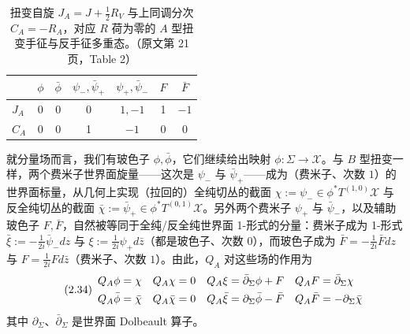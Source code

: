 \begin{table}[htbp]
\centering
\caption{扭变自旋 $J_A=J+\frac12R_V$ 与上同调分次 $C_A=-R_A$，对应 $R$ 荷为零的 $A$ 型扭变手征与反手征多重态。（原文第 21 页，Table 2）}
\begin{tabular}{lcccccc}
\toprule
 & $\phi$ & $\bar\phi$ & $\psi_-,\bar\psi_+$ & $\psi_+,\bar\psi_-$ & $F$ & $\bar F$\\
\midrule
$J_A$ & 0 & 0 & 0 & $1,-1$ & 1 & $-1$\\
$C_A$ & 0 & 0 & 1 & $-1$ & 0 & 0\\
\bottomrule
\end{tabular}
\end{table}

就分量场而言，我们有玻色子 $\phi,\bar\phi$，它们继续给出映射 $\phi:\Sigma\to\mathcal{X}$。与 $B$ 型扭变一样，两个费米子世界面旋量——这次是 $\psi_-$ 与 $\bar\psi_+$——成为（费米子、次数 $1$）的世界面标量，从几何上实现（拉回的）全纯切丛的截面 $\chi:=\psi_-\in\phi^*T^{(1,0)}\mathcal{X}$ 与反全纯切丛的截面 $\bar\chi:=\bar\psi_+\in\phi^*T^{(0,1)}\mathcal{X}$。另外两个费米子 $\psi_+$ 与 $\bar\psi_-$，以及辅助玻色子 $F,\bar F$，自然被等同于全纯/反全纯世界面 1-形式的分量：费米子成为 1-形式 $\bar\xi:=-\frac{1}{2i}\bar\psi_-dz$ 与 $\xi:=\frac{1}{2i}\psi_+d\bar z$（都是玻色子、次数 $0$），而玻色子成为 $\bar F=-\frac{1}{2i}\bar Fdz$ 与 $F=\frac{1}{2i}Fd\bar z$（费米子、次数 $1$）。由此，$Q_A$ 对这些场的作用为
\begin{equation}\tag{2.34}
\begin{array}{l@{\quad}l@{\quad}l@{\quad}l}
Q_A\phi=\chi & Q_A\chi=0 & Q_A\xi=\bar\partial_\Sigma\phi+F & Q_A F=\bar\partial_\Sigma\chi\\[4pt]
Q_A\bar\phi=\bar\chi & Q_A\bar\chi=0 & Q_A\bar\xi=\partial_\Sigma\bar\phi-\bar F & Q_A\bar F=-\partial_\Sigma\bar\chi
\end{array}
\end{equation}
其中 $\partial_\Sigma$、$\bar\partial_\Sigma$ 是世界面 Dolbeault 算子。
